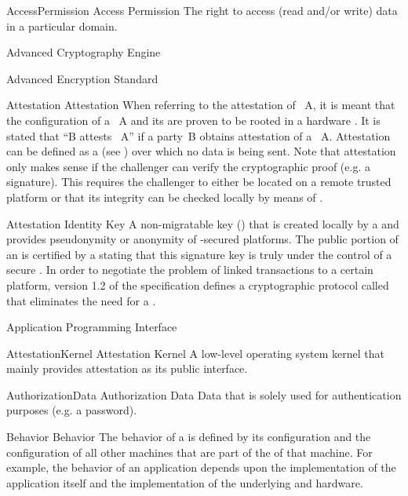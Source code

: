 \newcommand{\role}[1]{\ensuremath{\mathcal{#1\xspace}\xspace}\xspace}

\glosentry
    {AccessPermission}
    {Access Permission}
    {The right to access (read and/or write) data in a particular domain.}

    {Advanced Cryptography Engine}

    {Advanced Encryption Standard}

\glosentry
    {Attestation}
    {Attestation}
    {When referring to the attestation of \Compartment~A, it is meant that the
configuration of a \Compartment~A and its \TCB are proven to be rooted in a
hardware \RTM. It is stated that ``B attests \Compartment~A'' if a party~B
obtains attestation of a \Compartment~A. Attestation can be defined as a
\TrustedChannel (see \Channel) over which no data is being sent. Note that
attestation only makes sense if the challenger can verify the cryptographic
proof (e.g. a signature). This requires the challenger to either be located on a
remote trusted platform or that its integrity can be checked locally by means of
\Sealing.}

    {Attestation Identity Key}
    {A non-migratable key (\NMK) that is created locally by a \TPM and provides pseudonymity or
anonymity of \TPM-secured platforms. The public portion of an \AIK is certified
by a \PrivacyCA stating that this signature key is truly under the control of a
secure \TPM. In order to negotiate the problem of linked transactions to a certain platform, version 1.2 of the \TCG specification defines a cryptographic protocol called \DAA that eliminates
the need for a \PrivacyCA.}

    {Application Programming Interface}

\glosentry
    {AttestationKernel}
    {Attestation Kernel}
    {A low-level operating system kernel that mainly provides attestation as its
public interface.}

\glosentry
    {AuthorizationData}
    {Authorization Data}
    {Data that is solely used for authentication purposes (e.g. a password).}

\glosentry
    {Behavior}
    {Behavior}
    {The behavior of a \Machine is defined by its configuration and the
configuration of all other machines that are part of the \TCB of that machine.
For example, the behavior of an application depends upon the implementation of
the application itself and the implementation of the underlying \OperatingSystem
and hardware.}

